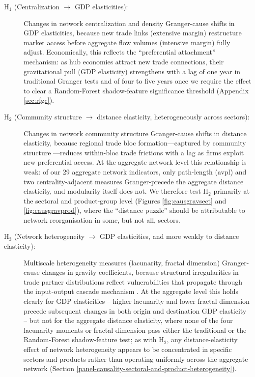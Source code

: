 \documentclass[preprint, 3p,
authoryear]{elsarticle} %
\begin{document}
\begin{description}
\item[H$_1$ (Centralization $\rightarrow$ GDP elasticities):] Changes in network centralization and density Granger-cause shifts in GDP elasticities, because new trade links (extensive margin) restructure market access before aggregate flow volumes (intensive margin) fully adjust. Economically, this reflects the ``preferential attachment'' mechanism: as hub economies attract new trade connections, their gravitational pull (GDP elasticity) strengthens with a lag of one year in traditional Granger tests and of four to five years once we require the effect to clear a Random-Forest shadow-feature significance threshold (Appendix \ref{sec:rfgc}).

\item[H$_2$ (Community structure $\rightarrow$ distance elasticity, heterogeneously across sectors):] Changes in network community structure Granger-cause shifts in distance elasticity, because regional trade bloc formation---captured by community structure \citep{caliendo2015estimates}---reduces within-bloc trade frictions with a lag as firms exploit new preferential access. At the aggregate network level this relationship is weak: of our 29 aggregate network indicators, only path-length (\gls{avpl}) and two centrality-adjacent measures Granger-precede the aggregate distance elasticity, and modularity itself does not. We therefore test H$_2$ primarily at the sectoral and product-group level (Figures \ref{fig:causgravsect} and \ref{fig:causgravprod}), where the ``distance puzzle'' \citep{disdier2008} should be attributable to network reorganisation in some, but not all, sectors.

\item[H$_3$ (Network heterogeneity $\rightarrow$ GDP elasticities, and more weakly to distance elasticity):] Multiscale heterogeneity measures (lacunarity, fractal dimension) Granger-cause changes in gravity coefficients, because structural irregularities in trade partner distributions reflect vulnerabilities that propagate through the input-output cascade mechanism \citep{acemoglu2012, baqaee2019macroeconomic}. At the aggregate level this holds clearly for GDP elasticities -- higher lacunarity and lower fractal dimension precede subsequent changes in both origin and destination GDP elasticity -- but not for the aggregate distance elasticity, where none of the four lacunarity moments or fractal dimension pass either the traditional or the Random-Forest shadow-feature test; as with H$_2$, any distance-elasticity effect of network heterogeneity appears to be concentrated in specific sectors and products rather than operating uniformly across the aggregate network (Section \ref{panel-causality-sectoral-and-product-heterogeneity}).
\end{description}
\end{document}
